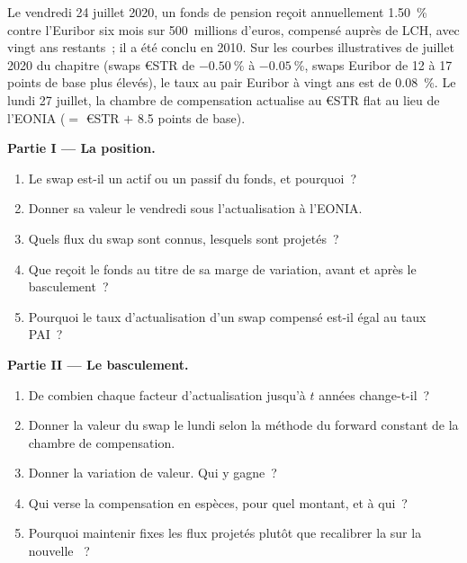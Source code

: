 \begin{problem}\label{pb:rc:multi-curve-and-collateral-discounting:1}
Le vendredi 24 juillet 2020, un fonds de pension reçoit annuellement 1.50~\% contre
l'Euribor six mois sur 500~millions d'euros, compensé auprès de LCH, avec vingt ans restants~;
il a été conclu en 2010. Sur les courbes illustratives de juillet 2020 du chapitre
(swaps €STR de $-0.50~\%$ à $-0.05~\%$, swaps Euribor de 12 à 17 points de base
plus élevés), le taux au pair Euribor à vingt ans est de 0.08~\%. Le lundi 27 juillet, la
chambre de compensation actualise au €STR flat au lieu de l'EONIA ($=$ €STR $+$ 8.5
points de base).

\medskip\noindent\textbf{Partie I --- La position.}
\begin{enumerate}
\item Le swap est-il un actif ou un passif du fonds, et pourquoi~?
\item Donner sa valeur le vendredi sous l'actualisation à l'EONIA.
\item Quels flux du swap sont connus, lesquels sont projetés~?
\item Que reçoit le fonds au titre de sa marge de variation, avant et après le basculement~?
\item Pourquoi le taux d'actualisation d'un swap compensé est-il égal au taux PAI~?
\end{enumerate}

\medskip\noindent\textbf{Partie II --- Le basculement.}
\begin{enumerate}[resume]
\item De combien chaque facteur d'actualisation jusqu'à $t$ années change-t-il~?
\item Donner la valeur du swap le lundi selon la méthode du forward constant de la chambre de compensation.
\item Donner la variation de valeur. Qui y gagne~?
\item Qui verse la compensation en espèces, pour quel montant, et à qui~?
\item Pourquoi maintenir fixes les flux projetés plutôt que recalibrer la
 sur la nouvelle ~?
\end{enumerate}


\end{problem}
